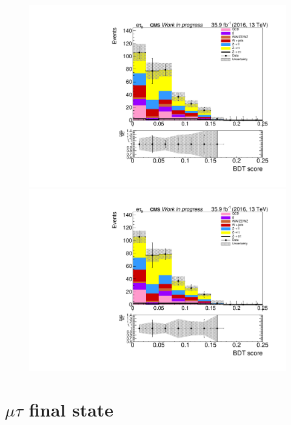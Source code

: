 \begin{figure}[htp]
	\begin{multicols}{2}
		\includegraphics[width=\linewidth]{plots/et/MultiJet_prefit.pdf}\par 
		\includegraphics[width=\linewidth]{plots/et/MultiJet_postfit.pdf}\par
	\end{multicols}		
\end{figure}


\newpage

\section*{$\mu\tau$ final state}

